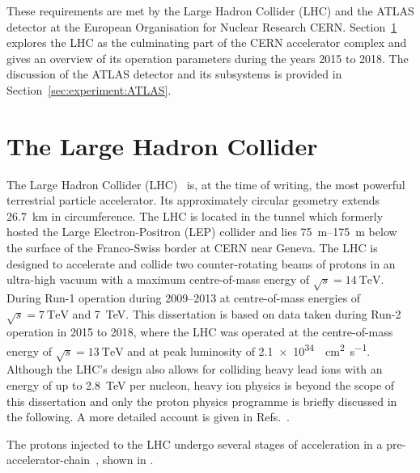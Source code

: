 These requirements are met by the Large Hadron Collider (LHC) and the ATLAS detector at the European Organisation for Nuclear Research CERN. Section~\ref{sec:experiment:LHC} explores the LHC as the culminating part of the CERN accelerator complex and gives an overview of its operation parameters during the years 2015 to 2018. The discussion of the ATLAS detector and its subsystems is provided in Section~\ref{sec:experiment:ATLAS}.


\section{The Large Hadron Collider}
\label{sec:experiment:LHC}
The Large Hadron Collider (LHC)~\cite{Evans2008} is, at the time of writing, the most powerful terrestrial particle accelerator. Its approximately circular geometry extends \SI{26.7}{\kilo\meter} in circumference. The LHC is located in the tunnel which formerly hosted the Large Electron-Positron (LEP) collider and lies \SIrange{75}{175}{\meter} below the surface of the Franco-Swiss border at CERN near Geneva.
The LHC is designed to accelerate and collide two counter-rotating beams of protons in an ultra-high vacuum with a maximum centre-of-mass energy of \(\sqrt{s} = \SI{14}{\tera\electronvolt}\). During Run-1 operation during \numrange{2009}{2013} at centre-of-mass energies of \(\sqrt{s} = \SI{7}{\tera\electronvolt}\) and \SI{7}{\tera\electronvolt}. This dissertation is based on data taken during Run-2 operation in 2015 to 2018, where the LHC was operated at the centre-of-mass energy of \(\sqrt{s} = \SI{13}{\tera\electronvolt}\) and at peak luminosity of \SI{2.1e34}{\per\square\centi\meter\per\second}. Although the LHC's design also allows for colliding heavy lead ions with an energy of up to \SI{2.8}{\tera\electronvolt} per nucleon, heavy ion physics is beyond the scope of this dissertation and only the proton physics programme is briefly discussed in the following. A more detailed account is given in Refs.~\cite{Bruning2004v1,Bruning2004v2,Benedikt2004}.

The protons injected to the LHC undergo several stages of acceleration in a pre-accelerator-chain~\cite{Benedikt2004}, shown in .

